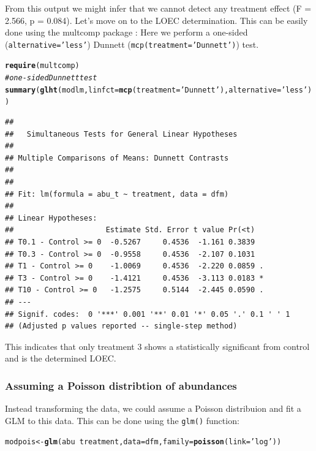 \documentclass{scrartcl}\usepackage[]{graphicx}\usepackage[]{color}
\makeatletter
\newcommand{\hlstr}[1]{\textcolor[rgb]{0.192,0.494,0.8}{#1}}%
\newcommand{\hlcom}[1]{\textcolor[rgb]{0.678,0.584,0.686}{\textit{#1}}}%
\newcommand{\hlopt}[1]{\textcolor[rgb]{0,0,0}{#1}}%
\newcommand{\hlstd}[1]{\textcolor[rgb]{0.345,0.345,0.345}{#1}}%
\newcommand{\hlkwb}[1]{\textcolor[rgb]{0.69,0.353,0.396}{#1}}%
\newcommand{\hlkwc}[1]{\textcolor[rgb]{0.333,0.667,0.333}{#1}}%
\newcommand{\hlkwd}[1]{\textcolor[rgb]{0.737,0.353,0.396}{\textbf{#1}}}%
\newenvironment{kframe}{%
 \def\at@end@of@kframe{}%
 \ifinner\ifhmode%
  \def\at@end@of@kframe{\end{minipage}}%
  \begin{minipage}{\columnwidth}%
 \fi\fi%
 \def\FrameCommand##1{\hskip\@totalleftmargin \hskip-\fboxsep
 \colorbox{shadecolor}{##1}\hskip-\fboxsep
     \hskip-\linewidth \hskip-\@totalleftmargin \hskip\columnwidth}%
 \MakeFramed {\advance\hsize-\width
   \@totalleftmargin\z@ \linewidth\hsize
   \@setminipage}}%
 {\par\unskip\endMakeFramed%
 \at@end@of@kframe}
\newenvironment{knitrout}{}{} %
\makeatother
\begin{document}
From this output we might infer that we cannot detect any treatment effect (F = 2.566, p = 0.084).
Let's move on to the LOEC determination. This can be easily done using the multcomp package \citep{hothorn_simultaneous_2008}:
Here we perform a one-sided (\texttt{alternative='less'}) Dunnett (\texttt{mcp(treatment='Dunnett')}) test.
\begin{knitrout}
\color{fgcolor}\begin{kframe}
\begin{alltt}
\hlkwd{require}\hlstd{(multcomp)}
\hlcom{# one-sided Dunnett test}
\hlkwd{summary}\hlstd{(}\hlkwd{glht}\hlstd{(modlm,} \hlkwc{linfct} \hlstd{=} \hlkwd{mcp}\hlstd{(}\hlkwc{treatment} \hlstd{=} \hlstr{'Dunnett'}\hlstd{),}  \hlkwc{alternative} \hlstd{=} \hlstr{'less'}\hlstd{))}
\end{alltt}
\begin{verbatim}
## 
## 	 Simultaneous Tests for General Linear Hypotheses
## 
## Multiple Comparisons of Means: Dunnett Contrasts
## 
## 
## Fit: lm(formula = abu_t ~ treatment, data = dfm)
## 
## Linear Hypotheses:
##                     Estimate Std. Error t value Pr(<t)  
## T0.1 - Control >= 0  -0.5267     0.4536  -1.161 0.3839  
## T0.3 - Control >= 0  -0.9558     0.4536  -2.107 0.1031  
## T1 - Control >= 0    -1.0069     0.4536  -2.220 0.0859 .
## T3 - Control >= 0    -1.4121     0.4536  -3.113 0.0183 *
## T10 - Control >= 0   -1.2575     0.5144  -2.445 0.0590 .
## ---
## Signif. codes:  0 '***' 0.001 '**' 0.01 '*' 0.05 '.' 0.1 ' ' 1
## (Adjusted p values reported -- single-step method)
\end{verbatim}
\end{kframe}
\end{knitrout}

This indicates that only treatment 3 shows a statistically significant from control and is the determined LOEC.




\subsubsection{Assuming a Poisson distribtion of abundances}

Instead transforming the data, we could assume a Poisson distribuion and fit a GLM to this data.
This can be done using the \texttt{glm()} function:
\begin{knitrout}
\color{fgcolor}\begin{kframe}
\begin{alltt}
\hlstd{modpois} \hlkwb{<-} \hlkwd{glm}\hlstd{(abu} \hlopt{~} \hlstd{treatment,} \hlkwc{data} \hlstd{= dfm,} \hlkwc{family} \hlstd{=} \hlkwd{poisson}\hlstd{(}\hlkwc{link} \hlstd{=} \hlstr{'log'}\hlstd{))}
\end{alltt}
\end{kframe}
\end{knitrout}
\end{document}
